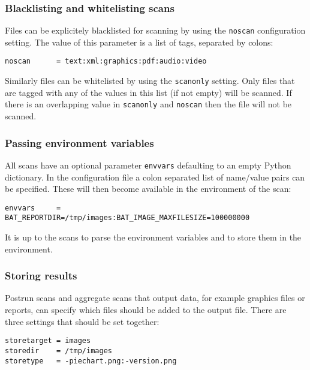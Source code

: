 \documentclass[10pt]{article}
\begin{document}
\subsubsection{Blacklisting and whitelisting scans}

Files can be explicitely blacklisted for scanning by using the \texttt{noscan}
configuration setting. The value of this parameter is a list of tags, separated
by colons:

\begin{verbatim}
noscan      = text:xml:graphics:pdf:audio:video
\end{verbatim}

Similarly files can be whitelisted by using the \texttt{scanonly} setting. Only
files that are tagged with any of the values in this list (if not empty) will
be scanned. If there is an overlapping value in \texttt{scanonly} and
\texttt{noscan} then the file will not be scanned.

\subsubsection{Passing environment variables}

All scans have an optional parameter \texttt{envvars} defaulting to an empty
Python dictionary. In the configuration file a colon separated list of
name/value pairs can be specified. These will then become available in the
environment of the scan:

\begin{verbatim}
envvars     = BAT_REPORTDIR=/tmp/images:BAT_IMAGE_MAXFILESIZE=100000000
\end{verbatim}

It is up to the scans to parse the environment variables and to store them in
the environment.

\subsubsection{Storing results}

Postrun scans and aggregate scans that output data, for example graphics files
or reports, can specify which files should be added to the output file. There
are three settings that should be set together:

\begin{verbatim}
storetarget = images
storedir    = /tmp/images
storetype   = -piechart.png:-version.png
\end{verbatim}
\end{document}

